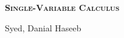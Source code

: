 \documentclass[./main.tex]{subfiles}
\begin{document}
\begin{titlingpage}                           %
    \centering                              %
    \selectfont             %
    \vspace*{\fill}                         %
    \scshape                                %
    \Huge \textbf{Single-Variable Calculus} %

    \vspace{0.025 \paperheight}             %

    \Large Syed, Danial Haseeb              %
    \vfill
\end{titlingpage}
\end{document}
